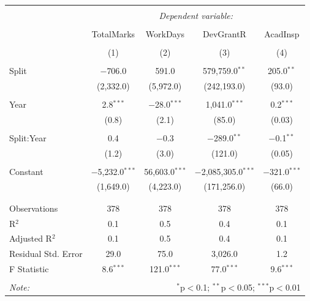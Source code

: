 \documentclass[12pt, a4paper]{article}
\begin{document}
\begin{table}[!htbp] \centering 
  \caption{} 
  \label{} 
\begin{tabular}{@{\extracolsep{5pt}}lcccc} 
\\[-1.8ex]\hline 
\hline \\[-1.8ex] 
 & \multicolumn{4}{c}{\textit{Dependent variable:}} \\ 
\cline{2-5} 
\\[-1.8ex] & TotalMarks & WorkDays & DevGrantR & AcadInsp \\ 
\\[-1.8ex] & (1) & (2) & (3) & (4)\\ 
\hline \\[-1.8ex] 
 Split & $-$706.0 & 591.0 & 579,759.0$^{**}$ & 205.0$^{**}$ \\ 
  & (2,332.0) & (5,972.0) & (242,193.0) & (93.0) \\ 
  & & & & \\ 
 Year & 2.8$^{***}$ & $-$28.0$^{***}$ & 1,041.0$^{***}$ & 0.2$^{***}$ \\ 
  & (0.8) & (2.1) & (85.0) & (0.03) \\ 
  & & & & \\ 
 Split:Year & 0.4 & $-$0.3 & $-$289.0$^{**}$ & $-$0.1$^{**}$ \\ 
  & (1.2) & (3.0) & (121.0) & (0.05) \\ 
  & & & & \\ 
 Constant & $-$5,232.0$^{***}$ & 56,603.0$^{***}$ & $-$2,085,305.0$^{***}$ & $-$321.0$^{***}$ \\ 
  & (1,649.0) & (4,223.0) & (171,256.0) & (66.0) \\ 
  & & & & \\ 
\hline \\[-1.8ex] 
Observations & 378 & 378 & 378 & 378 \\ 
R$^{2}$ & 0.1 & 0.5 & 0.4 & 0.1 \\ 
Adjusted R$^{2}$ & 0.1 & 0.5 & 0.4 & 0.1 \\ 
Residual Std. Error & 29.0 & 75.0 & 3,026.0 & 1.2 \\ 
F Statistic & 8.6$^{***}$ & 121.0$^{***}$ & 77.0$^{***}$ & 9.6$^{***}$ \\ 
\hline 
\hline \\[-1.8ex] 
\textit{Note:}  & \multicolumn{4}{r}{$^{*}$p$<$0.1; $^{**}$p$<$0.05; $^{***}$p$<$0.01} \\ 
\end{tabular} 
\end{table} %
\end{document}
